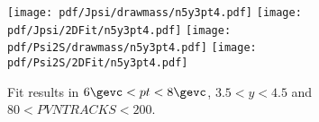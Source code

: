 \begin{figure}[H]
\begin{center}
\texttt{[image: pdf/Jpsi/drawmass/n5y3pt4.pdf]}
\texttt{[image: pdf/Jpsi/2DFit/n5y3pt4.pdf]}
\vspace*{-0.5cm}
\texttt{[image: pdf/Psi2S/drawmass/n5y3pt4.pdf]}
\texttt{[image: pdf/Psi2S/2DFit/n5y3pt4.pdf]}
\vspace*{-0.5cm}
\end{center}
\caption{Fit results in $6\gevc<pt<8\gevc$, $3.5<y<4.5$ and $80<PVNTRACKS<200$.}
\label{Fitn5y3pt4}
\end{figure}
